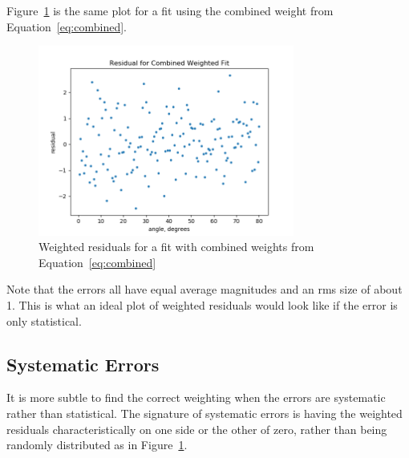\documentclass[english]{scrartcl}
\begin{document}
Figure~\ref{fig:res-combweight} is the same plot for a fit
using the combined weight from Equation~\ref{eq:combined}.
\begin{figure}[htb]
  \begin{center}
    \includegraphics[width=0.75\textwidth]{images/res-combweight}
  \end{center}
  \caption{\label{fig:res-combweight}Weighted residuals
  for a fit with combined weights from Equation~\ref{eq:combined}}
\end{figure}
Note that the errors all have equal average
magnitudes and an
rms size of about 1. This is what an ideal plot of weighted
residuals would look like if the error is only statistical.

\subsection{Systematic Errors}
It is more subtle to find the correct weighting when
the errors are systematic rather than statistical. The
signature of systematic errors is having the weighted
residuals characteristically on one side or the other
of zero, rather than being randomly distributed as
in Figure~\ref{fig:res-combweight}.

\appendix
\end{document}
